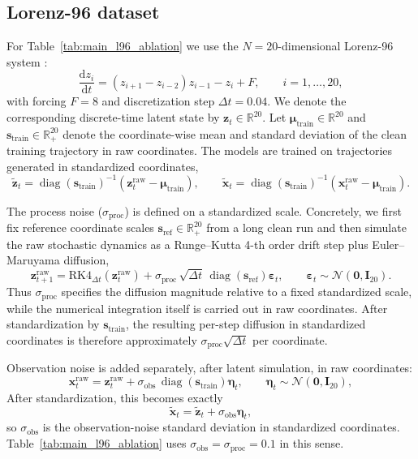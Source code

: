 \documentclass{article}
\theoremstyle{plain}
\theoremstyle{definition}
\theoremstyle{remark}
\begin{document}
\subsection{Lorenz-96 dataset}
\label{app:lorenz_datasets}
For Table~\ref{tab:main_l96_ablation} we use the $N=20$-dimensional Lorenz-96 system \citep{lorenz1996predictability}:
\[
\frac{\mathrm d z_i}{\mathrm d t}
=
(z_{i+1}-z_{i-2})z_{i-1}-z_i+F,
\qquad i=1,\dots,20,
\]
with forcing $F=8$ and discretization step $\Delta t=0.04$. 
We denote the corresponding discrete-time latent state by $\bm z_t\in\mathbb R^{20}$. Let $\bm\mu_{\mathrm{train}}\in\mathbb R^{20}$ and $\bm s_{\mathrm{train}}\in\mathbb R_+^{20}$ denote the coordinate-wise mean and standard deviation of the clean training trajectory in raw coordinates. The models are trained on trajectories generated in standardized coordinates,
\[
\tilde{\bm z}_t
=
\operatorname{diag}(\bm s_{\mathrm{train}})^{-1}(\bm z_t^{\mathrm{raw}}-\bm\mu_{\mathrm{train}}),
\qquad
\tilde{\bm x}_t
=
\operatorname{diag}(\bm s_{\mathrm{train}})^{-1}(\bm x_t^{\mathrm{raw}}-\bm\mu_{\mathrm{train}}).
\]

The process noise ($\sigma_{\mathrm{proc}}$) is defined on a standardized scale. Concretely, we first fix reference coordinate scales $\bm s_{\mathrm{ref}}\in\mathbb R_+^{20}$ from a long clean run and then simulate the raw stochastic dynamics as a Runge--Kutta 4-th order drift step plus Euler--Maruyama diffusion,
\begin{equation*}
\bm z_{t+1}^{\mathrm{raw}}
=
\mathrm{RK4}_{\Delta t}(\bm z_t^{\mathrm{raw}})
+
\sigma_{\mathrm{proc}}\,\sqrt{\Delta t}\,\operatorname{diag}(\bm s_{\mathrm{ref}})\bm\varepsilon_t, \qquad
\bm\varepsilon_t\sim\mathcal N(\bm 0,\bm I_{20}).
\end{equation*}
Thus $\sigma_{\mathrm{proc}}$ specifies the diffusion magnitude relative to a fixed standardized scale, while the numerical integration itself is carried out in raw coordinates. After standardization by $\bm s_{\mathrm{train}}$, the resulting per-step diffusion in standardized coordinates is therefore approximately $\sigma_{\mathrm{proc}}\sqrt{\Delta t}$ per coordinate.

Observation noise is added separately, after latent simulation, in raw coordinates:
\begin{equation*}
\bm x_t^{\mathrm{raw}}= \bm z_t^{\mathrm{raw}}+
\sigma_{\mathrm{obs}}\,\operatorname{diag}(\bm s_{\mathrm{train}})\bm\eta_t,\qquad
\bm\eta_t \sim\mathcal N(\bm 0,\bm I_{20}),
\end{equation*}
After standardization, this becomes exactly
\[
\tilde{\bm x}_t = \tilde{\bm z}_t + \sigma_{\mathrm{obs}}\bm\eta_t,
\]
so $\sigma_{\mathrm{obs}}$ is the observation-noise standard deviation in standardized coordinates. Table~\ref{tab:main_l96_ablation} uses $\sigma_{\mathrm{obs}}=\sigma_{\mathrm{proc}}=0.1$ in this sense.
\end{document}
